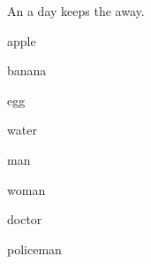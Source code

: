 \documentclass{exam-zh}
\begin{document}
An \fillin[apple] a day keeps the \fillin[doctor] away.

\begin{question}
  \begin{choices}
    \item apple
    \item banana
    \item egg
    \item water
  \end{choices}
\end{question}

\begin{question}
  \begin{choices}
    \item man
    \item woman
    \item doctor
    \item policeman
  \end{choices}
\end{question}
\end{document}
